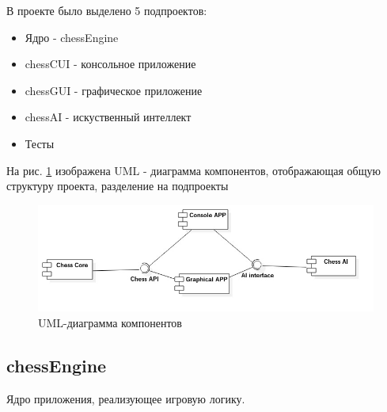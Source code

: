 В проекте было выделено 5 подпроектов:
\begin{itemize}
\item Ядро - chessEngine
\item chessCUI - консольное приложение
\item chessGUI - графическое приложение
\item chessAI - искуственный интеллект
\item Тесты
\end{itemize}

На рис. \ref{pic:ProjectOrganisation} изображена UML - диаграмма компонентов, отображающая общую структуру проекта, разделение на подпроекты

\begin{figure}[H]
	\begin{center}
		\includegraphics[scale=0.7]{../diagramms/component_dia.jpg}
		\caption{UML-диаграмма компонентов} 
		\label{pic:ProjectOrganisation} %
	\end{center}
\end{figure}



\subsection*{chessEngine}
Ядро приложения, реализующее игровую логику.\\


